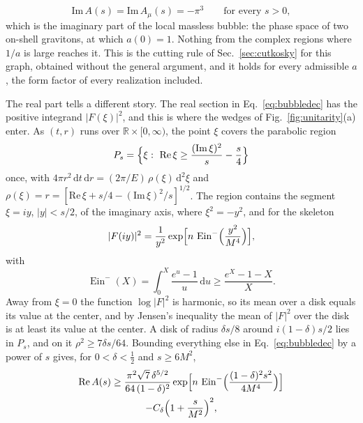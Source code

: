 \documentclass[aps,prd,10pt,twocolumn,superscriptaddress,nofootinbib,floatfix,longbibliography]{revtex4-2}
\newcommand{\bR}{\mathbb{R}}
\newcommand{\dd}{\mathrm{d}}
\newcommand{\Ein}{\operatorname{Ein}}
\begin{document}
\begin{equation}
\label{eq:bubbleIm}
\mathrm{Im}\,A(s)=\mathrm{Im}\,A_\mu(s)=-\pi^3\qquad\text{for every }s>0 ,
\end{equation}
which is the imaginary part of the local massless bubble: the phase space of two on-shell gravitons, at which $a(0)=1$. Nothing from the complex regions where $1/a$ is large reaches it. This is the cutting rule of Sec.~\ref{sec:cutkosky} for this graph, obtained without the general argument, and it holds for every admissible $a$, the form factor of every realization included.

The real part tells a different story. The real section in Eq.~\eqref{eq:bubbledec} has the positive integrand $|F(\xi)|^2$, and this is where the wedges of Fig.~\ref{fig:unitarity}(a) enter. As $(t,r)$ runs over $\bR\times[0,\infty)$, the point $\xi$ covers the parabolic region
\[
P_s=\Bigl\{\xi:\ \mathrm{Re}\,\xi\ge\frac{(\mathrm{Im}\,\xi)^2}s-\frac s4\Bigr\}
\]
once, with $4\pi r^2\,\dd t\,\dd r=(2\pi/E)\,\rho(\xi)\,\dd^2\xi$ and $\rho(\xi)=r=[\mathrm{Re}\,\xi+s/4-(\mathrm{Im}\,\xi)^2/s]^{1/2}$. The region contains the segment $\xi=iy$, $|y|<s/2$, of the imaginary axis, where $\xi^2=-y^2$, and for the skeleton
\[
|F(iy)|^2=\frac{1}{y^2}\exp\Bigl[n\,\Ein^-\Bigl(\frac{y^2}{M^4}\Bigr)\Bigr],
\]
with
\[
\Ein^-(X)=\int_0^X\frac{e^u-1}u\,\dd u\ge\frac{e^X-1-X}X .
\]
Away from $\xi=0$ the function $\log|F|^2$ is harmonic, so its mean over a disk equals its value at the center, and by Jensen's inequality the mean of $|F|^2$ over the disk is at least its value at the center. A disk of radius $\delta s/8$ around $i(1-\delta)s/2$ lies in $P_s$, and on it $\rho^2\ge7\delta s/64$. Bounding everything else in Eq.~\eqref{eq:bubbledec} by a power of $s$ gives, for $0<\delta<\frac12$ and $s\ge6M^2$,
\begin{multline}
\label{eq:bubblebound}
\mathrm{Re}\,A(s)\ge\frac{\pi^2\sqrt7\,\delta^{5/2}}{64\,(1-\delta)^2}\exp\Bigl[n\,\Ein^-\Bigl(\frac{(1-\delta)^2s^2}{4M^4}\Bigr)\Bigr]\\
-C_\delta\Bigl(1+\frac s{M^2}\Bigr)^{2},
\end{multline}
\end{document}

